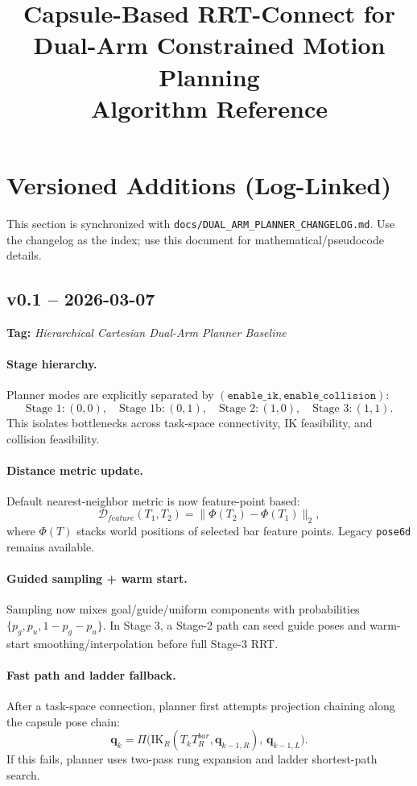 \documentclass[11pt]{article}
\title{\textbf{Capsule-Based RRT-Connect for Dual-Arm Constrained Motion Planning}\\[0.4em]
\large Algorithm Reference}
\author{}
\date{}
\begin{document}
\maketitle

\section*{Versioned Additions (Log-Linked)}

This section is synchronized with \texttt{docs/DUAL\_ARM\_PLANNER\_CHANGELOG.md}.
Use the changelog as the index; use this document for mathematical/pseudocode details.

\subsection*{v0.1 -- 2026-03-07}
\textbf{Tag:} \emph{Hierarchical Cartesian Dual-Arm Planner Baseline}

\paragraph{Stage hierarchy.}
Planner modes are explicitly separated by
\((\texttt{enable\_ik},\texttt{enable\_collision})\):
\[
\text{Stage 1}: (0,0),\quad
\text{Stage 1b}: (0,1),\quad
\text{Stage 2}: (1,0),\quad
\text{Stage 3}: (1,1).
\]
This isolates bottlenecks across task-space connectivity, IK feasibility, and collision feasibility.

\paragraph{Distance metric update.}
Default nearest-neighbor metric is now feature-point based:
\[
\mathcal{D}_{feature}(T_1,T_2)=\|\Phi(T_2)-\Phi(T_1)\|_2,
\]
where $\Phi(T)$ stacks world positions of selected bar feature points.
Legacy \texttt{pose6d} remains available.

\paragraph{Guided sampling + warm start.}
Sampling now mixes goal/guide/uniform components with probabilities
$\{p_g, p_u, 1-p_g-p_u\}$. In Stage 3, a Stage-2 path can seed guide poses and
warm-start smoothing/interpolation before full Stage-3 RRT.

\paragraph{Fast path and ladder fallback.}
After a task-space connection, planner first attempts projection chaining along the capsule pose chain:
\[
\mathbf{q}_{k} = \Pi\big(\mathrm{IK}_R(T_k T_R^{bar},\mathbf{q}_{k-1,R}),\,\mathbf{q}_{k-1,L}\big).
\]
If this fails, planner uses two-pass rung expansion and ladder shortest-path search.
\end{document}
